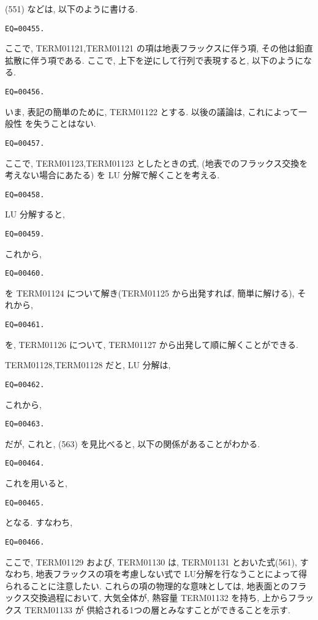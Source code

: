 (551) などは, 以下のように書ける.
%
\begin{verbatim}
EQ=00455.
\end{verbatim}
ここで, TERM01121,TERM01121
の項は地表フラックスに伴う項,
その他は鉛直拡散に伴う項である.
%
ここで, 上下を逆にして行列で表現すると, 以下のようになる.
%
\begin{verbatim}
EQ=00456.
\end{verbatim}

いま, 表記の簡単のために, TERM01122 とする.  以後の議論は, これによって一般性
を失うことはない.
%
\begin{verbatim}
EQ=00457.
\end{verbatim}
%
ここで,
TERM01123,TERM01123 としたときの式,
(地表でのフラックス交換を考えない場合にあたる)
を LU 分解で解くことを考える.
%
\begin{verbatim}
EQ=00458.
\end{verbatim}

LU 分解すると,
%
\begin{verbatim}
EQ=00459.
\end{verbatim}
%
これから, 
%
\begin{verbatim}
EQ=00460.
\end{verbatim}
%
を TERM01124 について解き(TERM01125 から出発すれば, 簡単に解ける), 
それから,
%
\begin{verbatim}
EQ=00461.
\end{verbatim}
%
を, TERM01126 について, TERM01127 から出発して順に解くことができる.

TERM01128,TERM01128 だと, LU 分解は, 
%
\begin{verbatim}
EQ=00462.
\end{verbatim}
%
これから, 
%
\begin{verbatim}
EQ=00463.
\end{verbatim}
%
だが, これと, (563) を見比べると, 以下の関係があることがわかる.
%
\begin{verbatim}
EQ=00464.
\end{verbatim}
%
これを用いると,
%
\begin{verbatim}
EQ=00465.
\end{verbatim}
%
となる. すなわち,
%
\begin{verbatim}
EQ=00466.
\end{verbatim}
%
ここで, TERM01129 および, TERM01130 は,
TERM01131 とおいた式(561),
すなわち, 地表フラックスの項を考慮しない式で
LU分解を行なうことによって得られることに注意したい.
これらの項の物理的な意味としては,
地表面とのフラックス交換過程において,
大気全体が, 熱容量 TERM01132 を持ち, 
上からフラックス TERM01133 が
供給される1つの層とみなすことができることを示す.

